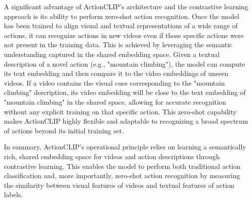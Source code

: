 A significant advantage of ActionCLIP's architecture and the contrastive learning approach is its ability to perform zero-shot action recognition. Once the model has been trained to align visual and textual representations of a wide range of actions, it can recognize actions in new videos even if those specific actions were not present in the training data. This is achieved by leveraging the semantic understanding captured in the shared embedding space. Given a textual description of a novel action (e.g., "mountain climbing"), the model can compute its text embedding and then compare it to the video embeddings of unseen videos. If a video contains the visual cues corresponding to the "mountain climbing" description, its video embedding will be close to the text embedding of "mountain climbing" in the shared space, allowing for accurate recognition without any explicit training on that specific action. This zero-shot capability makes ActionCLIP highly flexible and adaptable to recognizing a broad spectrum of actions beyond its initial training set.

In summary, ActionCLIP's operational principle relies on learning a semantically rich, shared embedding space for videos and action descriptions through contrastive learning. This enables the model to perform both traditional action classification and, more importantly, zero-shot action recognition by measuring the similarity between visual features of videos and textual features of action labels.
